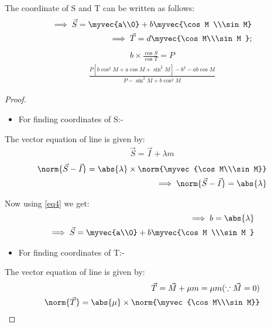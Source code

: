 \documentclass[journal,12pt,twocolumn]{IEEEtran}
\begin{document}
\begin{enumerate}
\begin{itemize}
\end{itemize}
\begin{lemma}
\label{lemma}
The coordinate of S and T can be written as follows:
\begin{align}
\implies \vec{S}=\myvec{a\\0} + b\myvec{\cos M \\\sin M} \label{eq13}
\\
\implies \vec{T}= d{\myvec{\cos M\\\sin M }};
\end{align}
\begin{align} 
b\times \frac{\cos S}{\cos T} =P 
\end{align}
\begin{align}
\frac{P[b\cos^2M +a\cos M +\sin^2M]-b^2-ab\cos M} {P-\sin^2 M +b\cos^2 M}  \label{eqb} 
\end{align}
\end{lemma}
\begin{proof}
\begin{itemize}
\item For finding coordinates of S:-
\end{itemize}
The vector equation of line is given by:
\begin{align}
\vec{S}=\vec{I} + \lambda m \label{eq8}
\end{align}
\begin{align}
\norm{\vec{S}-\vec{I}} = \abs{\lambda}\times\norm{\myvec{\cos M\\\sin M}} 
\\
\implies \norm{\vec{S}-\vec{I}}=\abs{\lambda}
\end{align}
\item Now using \eqref{eq4} we get:
\begin{align}
\implies b=\abs{\lambda} \label{eq12}
\\
\implies \vec{S}=\myvec{a\\0} + b\myvec{\cos M \\\sin M } 
\end{align}
\begin{itemize}
\item For finding coordinates of T:-
\end{itemize}
The vector equation of line is given by:
\begin{align}
\vec{T}=\vec{M} + \mu m =\mu m (\because \vec{M}=0) 
\\
\norm{\vec{T}}=\abs{\mu}\times\norm{\myvec{\cos M\\\sin M}} 

\end{align}
\end{proof}
\end{enumerate}
\end{document}
